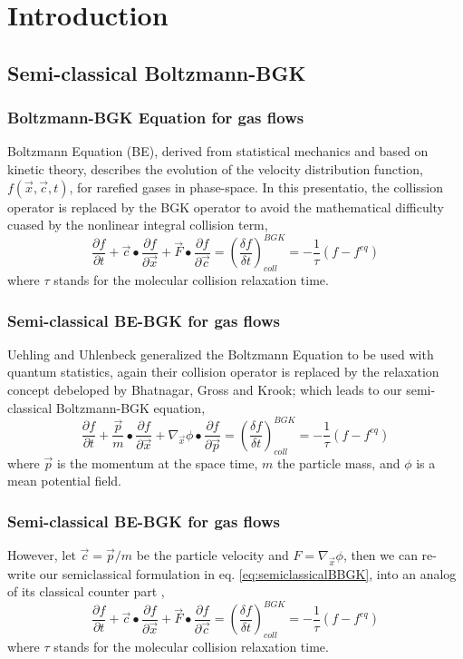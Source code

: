 \section{Introduction}
\subsection{Semi-classical Boltzmann-BGK}

\begin{frame}
	\frametitle{Boltzmann-BGK Equation for gas flows}
	Boltzmann Equation (BE), derived from statistical mechanics and based on kinetic theory, describes the evolution of the velocity distribution function, $f(\vec{x},\vec{c},t)$, for rarefied gases in phase-space. In this presentatio, the collission operator is replaced by the BGK operator to avoid the mathematical difficulty cuased by the nonlinear integral collision term,
	\begin{equation}
	\frac{\partial{f}}{\partial{t}} +
	\vec{c}\bullet\frac{\partial{f}}{\partial{\vec{x}}} +
	\vec{F}\bullet\frac{\partial{f}}{\partial{\vec{c}}} = 
	\left( \frac{\delta f}{\delta t}\right )^{BGK}_{coll} = -\frac{1}{\tau}(f-f^{eq})
	\label{eq:classicalBBGK}
	\end{equation}
	where $\tau$ stands for the molecular collision relaxation time.
\end{frame}

\begin{frame}
	\frametitle{Semi-classical BE-BGK for gas flows}
	Uehling and Uhlenbeck \cite{PhysRev.43.552} generalized the Boltzmann Equation to be used with quantum statistics, again their collision operator is replaced by the relaxation concept debeloped by Bhatnagar, Gross and Krook; which leads to our semi-classical Boltzmann-BGK equation,
	\begin{equation}
	\frac{\partial{f}}{\partial{t}} +
	\frac{\vec{p}}{m}\bullet\frac{\partial{f}}{\partial{\vec{x}}} +
	\nabla_\vec{x}{\phi}\bullet\frac{\partial{f}}{\partial{\vec{p}}} = 
	\left( \frac{\delta f}{\delta t}\right )^{BGK}_{coll} = -\frac{1}{\tau}(f-f^{eq})
	\label{eq:semiclassicalBBGK}
	\end{equation}
	where $\vec{p}$ is the momentum at the space time, $m$ the particle mass, and $\phi$ is a mean potential field.
\end{frame}

\begin{frame}
	\frametitle{Semi-classical BE-BGK for gas flows}
	However, let $\vec{c} = \vec{p} / m$ be the particle velocity and $F = \nabla_\vec{x}{\phi}$, then we can re-write our semiclassical formulation in eq. \ref{eq:semiclassicalBBGK}, into an analog of its classical counter part \cite{Yang2013},
	\begin{equation}
	\frac{\partial{f}}{\partial{t}} +
	\vec{c}\bullet\frac{\partial{f}}{\partial{\vec{x}}} +
	\vec{F}\bullet\frac{\partial{f}}{\partial{\vec{c}}} = 
	\left( \frac{\delta f}{\delta t}\right )^{BGK}_{coll} = -\frac{1}{\tau}(f-f^{eq})
	\end{equation}
	where $\tau$ stands for the molecular collision relaxation time.
\end{frame}

